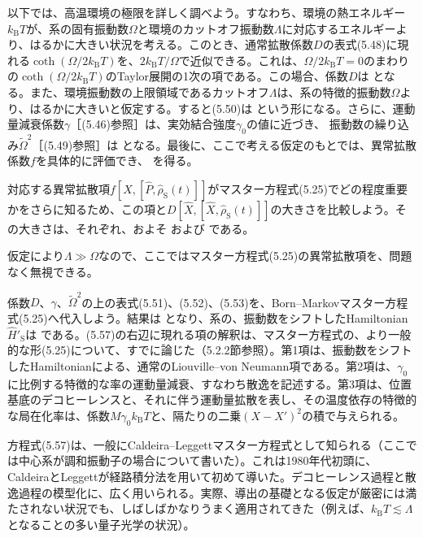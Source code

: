 \hypertarget{srcpage:191}{}\label{srcpage:191}
以下では、高温環境の極限を詳しく調べよう。すなわち、環境の熱エネルギー$k_{\mathrm B}T$が、系の固有振動数$\Omega$と環境のカットオフ振動数$\Lambda$に対応するエネルギーより、はるかに大きい状況を考える。このとき、通常拡散係数$D$の表式(5.48)に現れる$\coth(\Omega/2k_{\mathrm B}T)$を、$2k_{\mathrm B}T/\Omega$で近似できる。これは、$\Omega/2k_{\mathrm B}T=0$のまわりの$\coth(\Omega/2k_{\mathrm B}T)$のTaylor展開の1次の項である。この場合、係数$D$は
となる。また、環境振動数の上限領域であるカットオフ$\Lambda$は、系の特徴的振動数$\Omega$より、はるかに大きいと仮定する。すると(5.50)は
という形になる。さらに、運動量減衰係数$\gamma$［(5.46)参照］は、実効結合強度$\gamma_0$の値に近づき、
振動数の繰り込み$\widetilde\Omega^2$［(5.49)参照］は
となる。最後に、ここで考える仮定のもとでは、異常拡散係数$f$を具体的に評価でき、
を得る。

対応する異常拡散項$f[\hat X,[\hat P,\hat\rho_{\mathrm S}(t)]]$がマスター方程式(5.25)でどの程度重要かをさらに知るため、この項と$D[\hat X,[\hat X,\hat\rho_{\mathrm S}(t)]]$の大きさを比較しよう。その大きさは、それぞれ、およそ
および
である。

\hypertarget{srcpage:192}{}\label{srcpage:192}
仮定により$\Lambda\gg\Omega$なので、ここではマスター方程式(5.25)の異常拡散項を、問題なく無視できる。

係数$D$、$\gamma$、$\widetilde\Omega^2$の上の表式(5.51)、(5.52)、(5.53)を、Born--Markovマスター方程式(5.25)へ代入しよう。結果は
となり、系の、振動数をシフトしたHamiltonian $\hat H'_{\mathrm S}$は
である。(5.57)の右辺に現れる項の解釈は、マスター方程式の、より一般的な形(5.25)について、すでに論じた（5.2.2節参照）。第1項は、振動数をシフトしたHamiltonianによる、通常のLiouville--von Neumann項である。第2項は、$\gamma_0$に比例する特徴的な率の運動量減衰、すなわち散逸を記述する。第3項は、位置基底のデコヒーレンスと、それに伴う運動量拡散を表し、その温度依存の特徴的な局在化率は、係数$M\gamma_0k_{\mathrm B}T$と、隔たりの二乗$(X-X')^2$の積で与えられる。

方程式(5.57)は、一般にCaldeira--Leggettマスター方程式として知られる（ここでは中心系が調和振動子の場合について書いた）。これは1980年代初頭に、CaldeiraとLeggettが経路積分法を用いて初めて導いた\cite{ref221}。デコヒーレンス過程と散逸過程の模型化に、広く用いられる。実際、導出の基礎となる仮定が厳密には満たされない状況でも、しばしばかなりうまく適用されてきた（例えば、$k_{\mathrm B}T\lesssim\Lambda$となることの多い量子光学の状況\cite{ref222}）。

